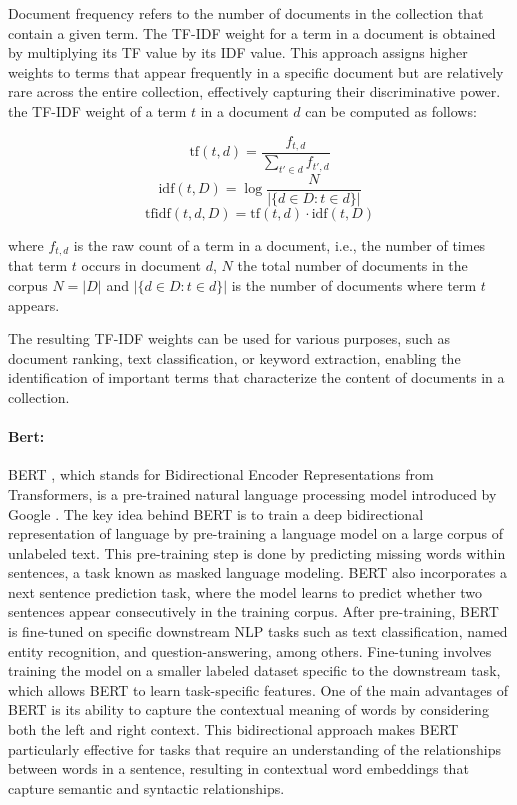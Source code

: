 \documentclass[a4paper,12pt]{article}
\begin{document}
Document frequency refers to the number of documents in the collection that contain a given term. The TF-IDF weight for a term in a document is obtained by multiplying its TF value by its IDF value. This approach assigns higher weights to terms that appear frequently in a specific document but are relatively rare across the entire collection, effectively capturing their discriminative power. the TF-IDF weight of a term $t$ in a document $d$ can be computed as follows:

$${\displaystyle \mathrm {tf} (t,d)={\frac {f_{t,d}}{\sum _{t'\in d}{f_{t',d}}}}}$$
$$ \mathrm{idf}(t, D) =  \log \frac{N}{|\{d \in D: t \in d\}|}$$
$${\displaystyle \mathrm {tfidf} (t,d,D)=\mathrm {tf} (t,d)\cdot \mathrm {idf} (t,D)}$$


where $f_{t,d}$ is the raw count of a term in a document, i.e., the number of times that term $t$ occurs in document $d$,
$N$ the total number of documents in the corpus $N=|D|$ and  $|\{d \in D: t \in d\}|$ is the number of documents where term $t$ appears.

The resulting TF-IDF weights can be used for various purposes, such as document ranking, text classification, or keyword extraction, enabling the identification of important terms that characterize the content of documents in a collection.

\paragraph{Bert:}

BERT \cite{bert}, which stands for Bidirectional Encoder Representations from Transformers, is a pre-trained natural language processing model introduced by Google \cite{bert}.
The key idea behind BERT is to train a deep bidirectional representation of language by pre-training a language model on a large corpus of unlabeled text. This pre-training step is done by predicting missing words within sentences, a task known as masked language modeling. 
BERT also incorporates a next sentence prediction task, where the model learns to predict whether two sentences appear consecutively in the training corpus.
After pre-training, BERT is fine-tuned on specific downstream NLP tasks such as text classification, named entity recognition, and question-answering, among others. 
Fine-tuning involves training the model on a smaller labeled dataset specific to the downstream task, which allows BERT to learn task-specific features.
One of the main advantages of BERT is its ability to capture the contextual meaning of words by considering both the left and right context. 
This bidirectional approach makes BERT particularly effective for tasks that require an understanding of the relationships between words in a sentence, resulting in contextual word embeddings that capture semantic and syntactic relationships.
\end{document}
